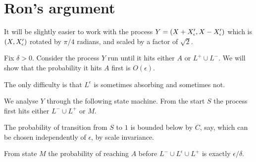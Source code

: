 {
\section{Ron's argument}

\newcommand{\bandwidth}{\delta}
\newcommand{\rotproc}{Y}

It will be slightly easier to work with the process $\rotproc =
(\sampled + \resamplede, \sampled - \resamplede)$ which is $(X,
X'_{\epsilon})$ rotated by $\pi / 4$ radians, and scaled by a factor of
$\sqrt{2}$.

Fix $\delta > 0$.  Consider the process $\rotproc$ run until it hits
either $A$ or $L^+ \cup L^-$.  We will show that the probability it
hits $A$ first is $O(\epsilon)$.

The only difficulty is that $L^\epsilon$ is sometimes absorbing and
sometimes not.

We analyse $\rotproc$ through the following state machine.  From the
start $S$ the process first hits either $L^- \cup L^+$ or $M$.

The probability of transition from $S$ to $1$ is bounded below by $C$,
say, which can be chosen independently of $\epsilon$, by scale
invariance.

From state $M$ the probability of reaching $A$ before $L^- \cup
L^\epsilon \cup L^+$ is exactly $\epsilon/\delta$.

}
